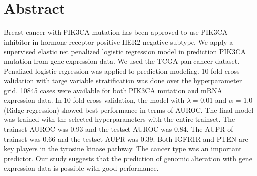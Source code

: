 \documentclass[10pt,letterpaper]{article}
\newcommand{\getIndex}[2]{
  \ForEach{,}{\IfEq{#1}{\thislevelitem}{\number\thislevelcount\ExitForEach}{}}{#2}
}
\newcommand{\getAff}[1]{
  \getIndex{#1}{}
}
\begin{document}
\vspace*{0.2in}

\section*{Abstract}
Breast cancer with PIK3CA mutation has been approved to use PIK3CA
inhibitor in hormone receptor-positive HER2 negative subtype. We apply a
supervised elastic net penalized logistic regression model in prediction
PIK3CA mutation from gene expression data. We used the TCGA pan-cancer
dataset. Penalized logistic regression was applied to prediction
modeling. 10-fold cross-validation with targe variable stratification
was done over the hyperparameter grid. 10845 cases were available for
both PIK3CA mutation and mRNA expression data. In 10-fold
cross-validation, the model with \(\lambda\) = 0.01 and \(\alpha\) = 1.0
(Ridge regression) showed best performance in terms of AUROC. The final
model was trained with the selected hyperparameters with the entire
trainset. The trainset AUROC was 0.93 and the testset AUROC was 0.84.
The AUPR of trainset was 0.66 and the testset AUPR was 0.39. Both IGFR1R
and PTEN are key players in the tyrosine kinase pathway. The cancer type
was an important predictor. Our study suggests that the prediction of
genomic alteration with gene expression data is possible with good
performance.
\end{document}
